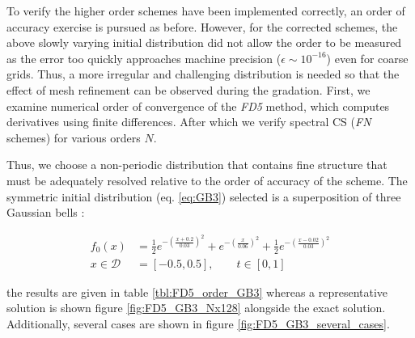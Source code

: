 \documentclass[11pt,titlepage]{report}
\begin{document}
To verify the higher order schemes have been implemented correctly, an order of accuracy exercise is pursued as before. However, for the corrected schemes, the above slowly varying initial distribution did not allow the order to be measured as the error too quickly approaches machine precision ($\epsilon \sim 10^{-16}$) even for coarse grids. Thus, a more irregular and challenging distribution is needed so that the effect of mesh refinement can be observed during the gradation. First, we examine numerical order of convergence of the \emph{FD5} method, which computes derivatives using finite differences. After which we verify spectral CS (\emph{FN} schemes) for various orders $N$.

Thus, we choose a non-periodic distribution that contains fine structure that must be adequately resolved relative to the order of accuracy of the scheme. The symmetric initial distribution (eq. \eqref{eq:GB3}) selected is a superposition of three Gaussian bells \cite{Guclu14}:

\begin{subequations}
\label{eq:GB3}
\begin{align}
f_0(x) & = \frac{1}{2}e^{-\left(\tfrac{x + 0.2}{0.03}\right)^2} + e^{-\left(\tfrac{x}{0.06}\right)^2} + \frac{1}{2}e^{-\left(\tfrac{x - 0.02}{0.03}\right)^2}  \\[0.8em]
x\in\mathcal{D} & = [-0.5, 0.5], \qquad t\in [0,1] 
\end{align}
\end{subequations}

\noindent the results are given in table \ref{tbl:FD5_order_GB3} whereas a representative solution is shown figure \ref{fig:FD5_GB3_Nx128} alongside the exact solution. Additionally, several cases are shown in figure \ref{fig:FD5_GB3_several_cases}.
\end{document}
